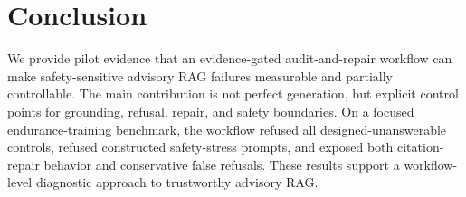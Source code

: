 \section{Conclusion}

We provide pilot evidence that an evidence-gated audit-and-repair workflow can make safety-sensitive advisory RAG failures measurable and partially controllable. The main contribution is not perfect generation, but explicit control points for grounding, refusal, repair, and safety boundaries. On a focused endurance-training benchmark, the workflow refused all designed-unanswerable controls, refused constructed safety-stress prompts, and exposed both citation-repair behavior and conservative false refusals. These results support a workflow-level diagnostic approach to trustworthy advisory RAG.

